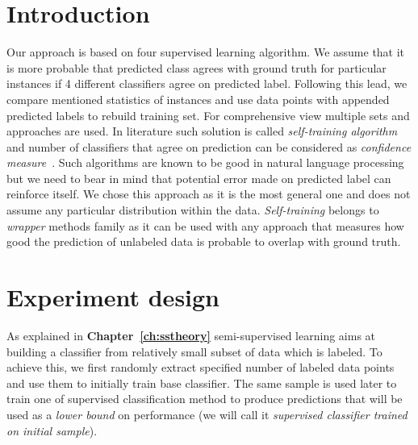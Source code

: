 \documentclass[12pt, a4paper, pdflatex]{report}
\begin{document}
\section{Introduction}
Our approach is based on four supervised learning algorithm. We assume that it is more probable that predicted class agrees with ground truth for particular instances if 4 different classifiers agree on predicted label. Following this lead, we compare mentioned statistics of instances and use data points with appended predicted labels to rebuild training set. For comprehensive view multiple sets and approaches are used. In literature such solution is called \emph{self-training algorithm} and number of classifiers that agree on prediction can be considered as \emph{confidence measure}~\cite{zhu2009introduction}. Such algorithms are known to be good in natural language processing but we need to bear in mind that potential error made on predicted label can reinforce itself. We chose this approach as it is the most general one and does not assume any particular distribution within the data. \emph{Self-training} belongs to \emph{wrapper} methods family as it can be used with any approach that measures how good the prediction of unlabeled data is probable to overlap with ground truth.

\section{Experiment design}
As explained in \textbf{Chapter~\ref{ch:sstheory}} semi-supervised learning aims at building a classifier from relatively small subset of data which is labeled. To achieve this, we first randomly extract specified number of labeled data points and use them to initially train base classifier. The same sample is used later to train one of supervised classification method to produce predictions that will be used as a \emph{lower bound} on performance (we will call it \emph{supervised classifier trained on initial sample}).
\end{document}
